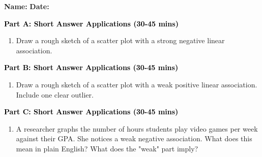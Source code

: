 \documentclass[12pt, letterpaper, fleqn]{article}
\begin{document}
\textbf{Name:} \underline{\hspace{5cm}}
\hfill
\textbf{Date:} \underline{\hspace{3cm}}\\


\begin{tcolorbox}[colback=customteal!20]
\large\textcolor{black}{\textbf{Part A: Short Answer Applications (30-45 mins)}}
\end{tcolorbox}

\vspace{3mm}

\begin{enumerate}[itemsep=4.2cm, leftmargin=0.6cm]
\item Draw a rough sketch of a scatter plot with a strong negative linear association.
\end{enumerate}

\newpage

\begin{tcolorbox}[colback=customteal!20]
\large\textcolor{black}{\textbf{Part B: Short Answer Applications (30-45 mins)}}
\end{tcolorbox}

\vspace{3mm}

\begin{enumerate}[itemsep=4.2cm, leftmargin=0.6cm, resume]
\item Draw a rough sketch of a scatter plot with a weak positive linear association. Include one clear outlier.
\end{enumerate}

\newpage

\begin{tcolorbox}[colback=customteal!20]
\large\textcolor{black}{\textbf{Part C: Short Answer Applications (30-45 mins)}}
\end{tcolorbox}

\vspace{3mm}

\begin{enumerate}[itemsep=4.2cm, leftmargin=0.6cm, resume]
\item A researcher graphs the number of hours students play video games per week against their GPA. She notices a weak negative association. What does this mean in plain English? What does the "weak" part imply?
\end{enumerate}

\newpage
\end{document}
